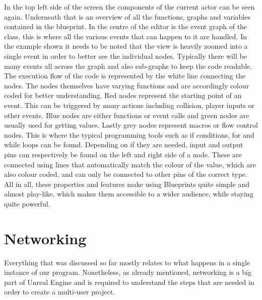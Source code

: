 In the top left side of the screen the components of the current actor can be seen again. Underneath that is an overview of all the functions, graphs and variables contained in the blueprint. In the centre of the editor is the event graph of the class, this is where all the various events that can happen to it are handled. In the example shown it needs to be noted that the view is heavily zoomed into a single event in order to better see the individual nodes. Typically there will be many events all across the graph and also sub-graphs to keep the code readable.\\
The execution flow of the code is represented by the white line connecting the nodes. The nodes themselves have varying functions and are accordingly colour coded for better understanding. Red nodes represent the starting point of an event. This can be triggered by many actions including collision, player inputs or other events. Blue nodes are either functions or event calls and green nodes are usually used for getting values. Lastly grey nodes represent macros or flow control nodes. This is where the typical programming tools such as if conditions, for and while loops can be found.
Depending on if they are needed, input and output pins can respectively be found on the left and right side of a node. These are connected using lines that automatically match the colour of the value, which are also colour coded, and can only be connected to other pins of the correct type.\\
All in all, these properties and features make using Blueprints quite simple and almost play-like, which makes them accessible to a wider audience, while staying quite powerful.

\section{Networking}

Everything that was discussed so far mostly relates to what happens in a single instance of our program. Nonetheless, as already mentioned, networking is a big part of Unreal Engine and is required to understand the steps that are needed in order to create a multi-user project.\\

